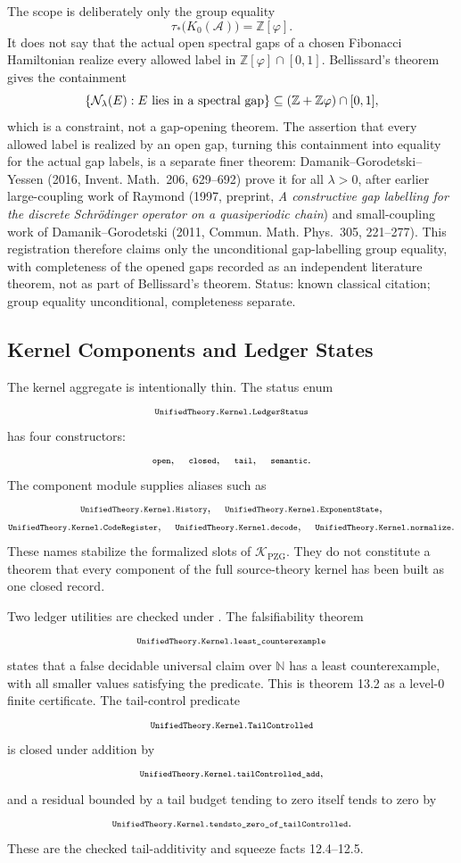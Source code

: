 \documentclass[11pt]{article}
\newcommand{\lean}[1]{\relax\ifmmode\hbox{\scriptsize\ttfamily\detokenize{#1}}\else{\small\texttt{\detokenize{#1}}}\fi}
\newcommand{\PZG}{\mathrm{PZG}}
\newcommand{\K}{\mathcal{K}}
\newcommand{\N}{\mathbb{N}}
\begin{document}
The scope is deliberately only the group equality
$$
  \tau_*\bigl(K_0(\mathcal A)\bigr)=\mathbb Z[\varphi].
$$
It does not say that the actual open spectral gaps of a chosen Fibonacci Hamiltonian realize every allowed label in $\mathbb Z[\varphi]\cap[0,1]$.  Bellissard's theorem gives the containment
$$
  \{\mathcal N_\lambda(E):E\ \hbox{lies in a spectral gap}\}
  \subseteq
  (\mathbb Z+\mathbb Z\varphi)\cap[0,1],
$$
which is a constraint, not a gap-opening theorem.  The assertion that every allowed label is realized by an open gap, turning this containment into equality for the actual gap labels, is a separate finer theorem: Damanik--Gorodetski--Yessen (2016, Invent. Math.\ 206, 629--692) prove it for all $\lambda>0$, after earlier large-coupling work of Raymond (1997, preprint, \emph{A constructive gap labelling for the discrete Schr\"odinger operator on a quasiperiodic chain}) and small-coupling work of Damanik--Gorodetski (2011, Commun. Math. Phys.\ 305, 221--277).  This registration therefore claims only the unconditional gap-labelling group equality, with completeness of the opened gaps recorded as an independent literature theorem, not as part of Bellissard's theorem.  Status: known classical citation; group equality unconditional, completeness separate.

\subsection{Kernel Components and Ledger States}

The kernel aggregate is intentionally thin.  The status enum
$$
  \lean{UnifiedTheory.Kernel.LedgerStatus}
$$
has four constructors:
$$
  \lean{open},\quad \lean{closed},\quad \lean{tail},\quad \lean{semantic}.
$$
The component module supplies aliases such as
$$
  \begin{gathered}
  \lean{UnifiedTheory.Kernel.History},\quad
  \lean{UnifiedTheory.Kernel.ExponentState},\\
  \lean{UnifiedTheory.Kernel.CodeRegister},\quad
  \lean{UnifiedTheory.Kernel.decode},\quad
  \lean{UnifiedTheory.Kernel.normalize}.
  \end{gathered}
$$
These names stabilize the formalized slots of $\K_{\PZG}$.  They do not constitute a theorem that every component of the full source-theory kernel has been built as one closed record.

Two ledger utilities are checked under \lean{UnifiedTheory.Kernel}.  The falsifiability theorem
$$
  \lean{UnifiedTheory.Kernel.least_counterexample}
$$
states that a false decidable universal claim over $\N$ has a least counterexample, with all smaller values satisfying the predicate.  This is theorem 13.2 as a level-0 finite certificate.  The tail-control predicate
$$
  \lean{UnifiedTheory.Kernel.TailControlled}
$$
is closed under addition by
$$
  \lean{UnifiedTheory.Kernel.tailControlled_add},
$$
and a residual bounded by a tail budget tending to zero itself tends to zero by
$$
  \lean{UnifiedTheory.Kernel.tendsto_zero_of_tailControlled}.
$$
These are the checked tail-additivity and squeeze facts 12.4--12.5.
\end{document}
